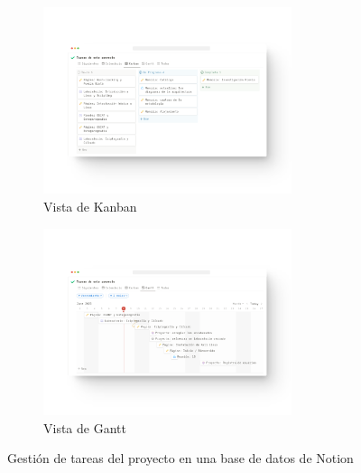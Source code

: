         \begin{figure}[!htbp]
            \centering

            \begin{subfigure}[!htbp]{\textwidth}
                \centering

                \includegraphics[width=0.8\textwidth]{images/Capturas/Notion Kanban.png}
                \caption{Vista de Kanban}
            \end{subfigure}
            
            \begin{subfigure}[!htbp]{\textwidth}
                \centering

                \includegraphics[width=0.8\textwidth]{images/Capturas/Notion Gantt.png}
                \caption{Vista de Gantt}
            \end{subfigure}
            
            \caption{Gestión de tareas del proyecto en una base de datos de Notion}
            \label{fig:notion-vistas}
        \end{figure}
        
